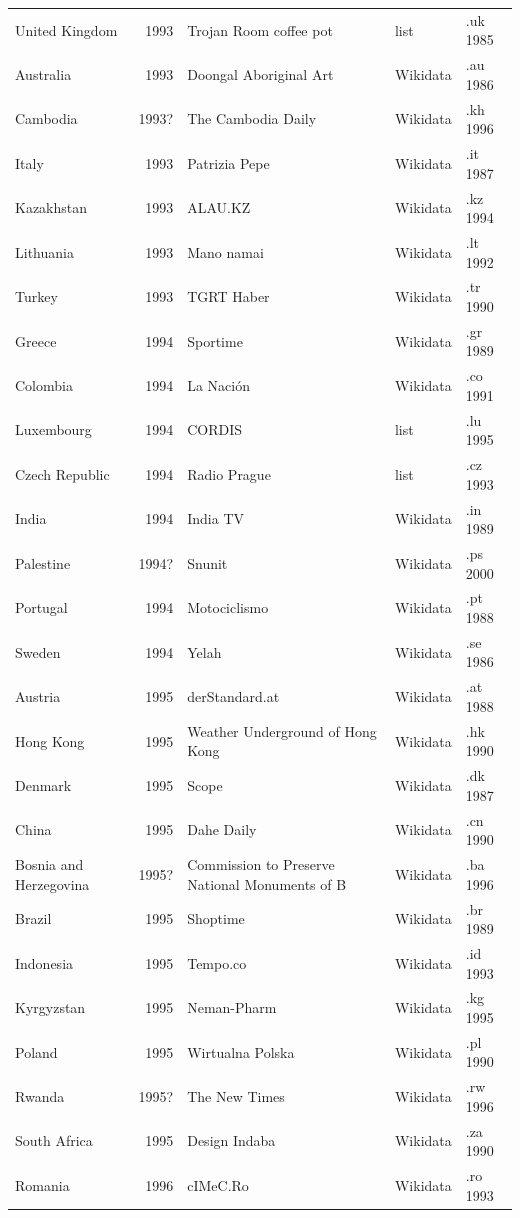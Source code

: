 \documentclass[11pt,a4paper]{article}
\begin{document}
\begin{small}
\begin{longtable}{lrp{6.2cm}ll}
United Kingdom & 1993 & Trojan Room coffee pot & list & .uk 1985\\
Australia & 1993 & Doongal Aboriginal Art & Wikidata & .au 1986\\
Cambodia & 1993? & The Cambodia Daily & Wikidata & .kh 1996\\
Italy & 1993 & Patrizia Pepe & Wikidata & .it 1987\\
Kazakhstan & 1993 & ALAU.KZ & Wikidata & .kz 1994\\
Lithuania & 1993 & Mano namai & Wikidata & .lt 1992\\
Turkey & 1993 & TGRT Haber & Wikidata & .tr 1990\\
Greece & 1994 & Sportime & Wikidata & .gr 1989\\
Colombia & 1994 & La Nación & Wikidata & .co 1991\\
Luxembourg & 1994 & CORDIS & list & .lu 1995\\
Czech Republic & 1994 & Radio Prague & list & .cz 1993\\
India & 1994 & India TV & Wikidata & .in 1989\\
Palestine & 1994? & Snunit & Wikidata & .ps 2000\\
Portugal & 1994 & Motociclismo & Wikidata & .pt 1988\\
Sweden & 1994 & Yelah & Wikidata & .se 1986\\
Austria & 1995 & derStandard.at & Wikidata & .at 1988\\
Hong Kong & 1995 & Weather Underground of Hong Kong & Wikidata & .hk 1990\\
Denmark & 1995 & Scope & Wikidata & .dk 1987\\
China & 1995 & Dahe Daily & Wikidata & .cn 1990\\
Bosnia and Herzegovina & 1995? & Commission to Preserve National Monuments of B & Wikidata & .ba 1996\\
Brazil & 1995 & Shoptime & Wikidata & .br 1989\\
Indonesia & 1995 & Tempo.co & Wikidata & .id 1993\\
Kyrgyzstan & 1995 & Neman-Pharm & Wikidata & .kg 1995\\
Poland & 1995 & Wirtualna Polska & Wikidata & .pl 1990\\
Rwanda & 1995? & The New Times & Wikidata & .rw 1996\\
South Africa & 1995 & Design Indaba & Wikidata & .za 1990\\
Romania & 1996 & cIMeC.Ro & Wikidata & .ro 1993\\

\end{longtable}
\end{small}
\end{document}
